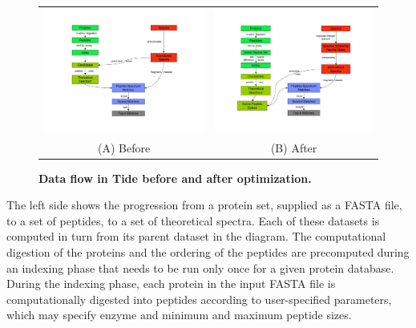 \begin{figure}
\centering
\begin{tabular}{cc}
\includegraphics[width=3.0in]{Diagrams_p1-p1-cropped.pdf} &
\includegraphics[width=3.0in]{Diagrams_p2-p2-cropped.pdf} \\
(A) Before & (B) After \\
\end{tabular}
\caption{{\bf Data flow in Tide before and after optimization.}
  \label{figure:dataflow}}
\end{figure}

The left side shows the progression from a protein set, supplied as a
FASTA file, to a set of peptides, to a set of theoretical
spectra. Each of these datasets is computed in turn from its parent
dataset in the diagram. The computational digestion of the proteins
and the ordering of the peptides are precomputed during an indexing
phase that needs to be run only once for a given protein database.
\DIFdelbegin {}\DIFdelend During the indexing phase, each protein in the input FASTA file is
computationally digested into peptides according to user-specified
parameters, which may specify enzyme and minimum and maximum peptide
sizes.

